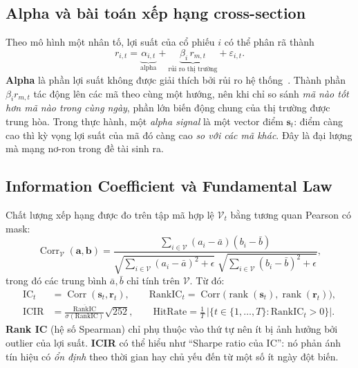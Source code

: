 \documentclass[a4paper,12pt]{article}
\DeclareMathOperator{\Corr}{Corr}
\DeclareMathOperator{\rk}{rank}
\begin{document}
\subsection{Alpha và bài toán xếp hạng cross-section}
Theo mô hình một nhân tố, lợi suất của cổ phiếu $i$ có thể phân rã thành
\begin{equation}
    r_{i,t} = \underbrace{\alpha_{i,t}}_{\text{alpha}} + \underbrace{\beta_i\, r_{m,t}}_{\text{rủi ro thị trường}} + \varepsilon_{i,t}.
\end{equation}
\textbf{Alpha} là phần lợi suất không được giải thích bởi rủi ro hệ thống~\cite{FamaFrench1992,FamaFrench1993}. Thành phần $\beta_i r_{m,t}$ tác động lên các mã theo cùng một hướng, nên khi chỉ so sánh \emph{mã nào tốt hơn mã nào trong cùng ngày}, phần lớn biến động chung của thị trường được trung hòa. Trong thực hành, một \emph{alpha signal} là một vector điểm $\mathbf{s}_t$: điểm càng cao thì kỳ vọng lợi suất của mã đó càng cao \emph{so với các mã khác}. Đây là đại lượng mà mạng nơ-ron trong đề tài sinh ra.

\subsection{Information Coefficient và Fundamental Law}
Chất lượng xếp hạng được đo trên tập mã hợp lệ $\mathcal{V}_t$ bằng tương quan Pearson có mask:
\begin{equation}
    \Corr_{\mathcal{V}}(\mathbf{a},\mathbf{b}) = \frac{\sum_{i\in\mathcal{V}}(a_i-\bar a)(b_i-\bar b)}{\sqrt{\sum_{i\in\mathcal{V}}(a_i-\bar a)^2+\epsilon}\;\sqrt{\sum_{i\in\mathcal{V}}(b_i-\bar b)^2+\epsilon}},
    \label{eq:masked_corr}
\end{equation}
trong đó các trung bình $\bar a, \bar b$ chỉ tính trên $\mathcal{V}$. Từ đó:
\begin{align}
    \mathrm{IC}_t &= \Corr(\mathbf{s}_t, \mathbf{r}_t), \qquad
    \mathrm{RankIC}_t = \Corr\big(\rk(\mathbf{s}_t), \rk(\mathbf{r}_t)\big), \\
    \mathrm{ICIR} &= \frac{\overline{\mathrm{RankIC}}}{\sigma(\mathrm{RankIC})}\sqrt{252}, \qquad
    \mathrm{HitRate} = \frac{1}{T}\,\big|\{t \in \{1,\dots,T\} : \mathrm{RankIC}_t > 0\}\big|.
\end{align}
\textbf{Rank IC} (hệ số Spearman) chỉ phụ thuộc vào thứ tự nên ít bị ảnh hưởng bởi outlier của lợi suất. \textbf{ICIR} có thể hiểu như ``Sharpe ratio của IC'': nó phản ánh tín hiệu có \emph{ổn định} theo thời gian hay chủ yếu đến từ một số ít ngày đột biến.
\end{document}
